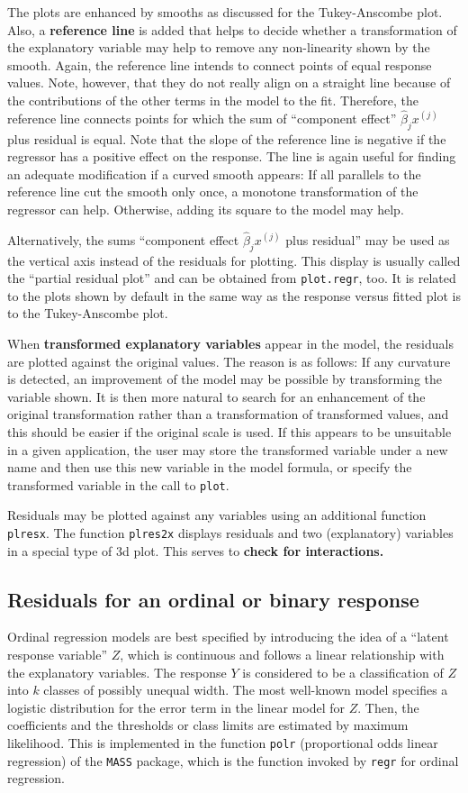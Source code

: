 \documentclass[11pt]{article}
\providecommand{\T}{\texttt}
\providecommand{\ul}{\textbf}
\begin{document}
The plots are enhanced by smooths as discussed for the Tukey-Anscombe
plot. 
Also, a \textbf{reference line} is added that helps to decide whether a
transformation of the explanatory variable may help to remove any
non-linearity shown by the smooth.
Again, the reference line intends to connect points of equal response
values. Note, however, that they do not really align on a straight line
because of the contributions of the other terms in the model to the fit.
Therefore, the reference line connects points for which the sum of 
``component effect'' $\widehat\beta_j x^{(j)}$ plus residual is equal.
Note that the slope of the reference line is negative if the regressor has
a positive effect on the response.
The line is again useful for finding an adequate modification if a curved
smooth appears: If all parallels to the reference line cut the smooth only
once, a monotone transformation of the regressor can help. 
Otherwise, adding its square to the model may help.

Alternatively, the sums 
``component effect $\widehat\beta_j x^{(j)}$ plus residual''
may be used as the vertical axis instead of the
residuals for plotting. This display is usually called the 
``partial residual plot'' and can be obtained from \T{plot.regr}, too. 
It is related to the plots shown by default in the same way as the
response versus fitted plot is to the Tukey-Anscombe plot.

When \ul{transformed explanatory variables} appear in the model, the
residuals are plotted against the original values. The reason is as
follows: If any curvature is detected, an improvement of the model may be
possible by transforming the variable shown. It is then more natural
to search for an enhancement of the original transformation rather than 
a transformation of transformed values, and this should be easier if 
the original scale is used.
If this appears to be unsuitable in a given application, the user
may store the transformed variable under a new name and then use 
this new variable in the model formula, or specify the transformed 
variable in the call to \T{plot}.

Residuals may be plotted against any variables using an additional function 
\T{plresx}. The function \T{plres2x} displays residuals and two
(explanatory) variables in a special type of 3d plot. This serves to 
\ul{check for interactions.}

\subsection{Residuals for an ordinal or binary response}
Ordinal regression models are best specified by introducing the idea of a 
``latent response variable'' $Z$, which is continuous and follows a linear
relationship with the explanatory variables. 
The response $Y$ is considered to be a classification of $Z$ into $k$
classes of possibly unequal width. The most well-known model specifies a 
logistic distribution for the error term in the linear model for $Z$.
Then, the coefficients and the thresholds or class limits are estimated by
maximum likelihood. This is implemented in the function \T{polr} 
(proportional odds linear regression) of the \T{MASS} package, 
which is the function invoked by \T{regr} for ordinal regression.
\end{document}
